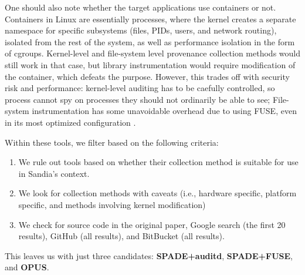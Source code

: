 One should also note whether the target applications use containers or not.
Containers in Linux are essentially processes, where the kernel creates a separate namespace for specific subsystems (files, PIDs, users, and network routing), isolated from the rest of the system, as well as performance isolation in the form of cgroups.
Kernel-level and file-system level provenance collection methods would still work in that case, but library instrumentation would require modification of the container, which defeats the purpose.
However, this trades off with security risk and performance: kernel-level auditing has to be caefully controlled, so process cannot spy on processes they should not ordinarily be able to see; File-system instrumentation has some unavoidable overhead due to using FUSE, even in its most optimized configuration \cite{vangoor_fuse_2017}.

Within these tools, we filter based on the following criteria:

\begin{enumerate}
\item
We rule out tools based on whether their collection method is suitable for use in Sandia's context.

\item
We look for collection methods with caveats (i.e., hardware specific, platform specific, and methods involving kernel modification)

\item
We check for source code in the original paper, Google search (the first 20 results), GitHub (all results), and BitBucket (all results).
\end{enumerate}

This leaves us with just three candidates: \textbf{SPADE+auditd}, \textbf{SPADE+FUSE}, and \textbf{OPUS}.

